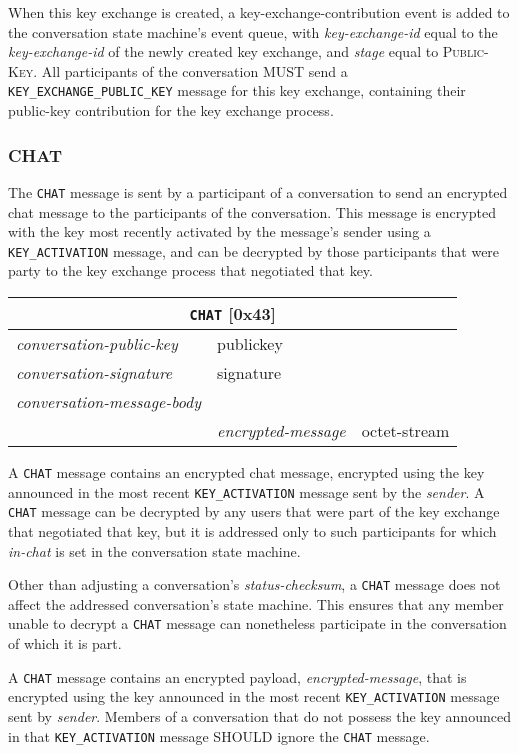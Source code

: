 \documentclass{article}
\def\message#1{\texttt{#1}}
\def\field#1{\textit{#1}}
\def\smfield#1{\textsl{#1}}
\def\type#1{\textsf{#1}}
\newenvironment{conversationmessage}[2]{
\newcommand{\messagefield}[2]{
& \field{##1} & \type{##2} \\
\hline
}
\hspace{2em minus 2em}\begin{tabular}{|l|l|l|}
\hline
\multicolumn{3}{|c|}{\message{#1} [#2]} \\
\hline
\hline
\field{conversation-public-key} & \multicolumn{2}{l|}{\type{publickey}} \\
\hline
\field{conversation-signature} & \multicolumn{2}{l|}{\type{signature}} \\
\hline
\field{conversation-message-body} & \multicolumn{2}{l|}{} \\
\hline
}{
\end{tabular}
}
\begin{document}
When this key exchange is created, a \type{key-exchange-contribution} event is added to the conversation state machine's event queue, with \smfield{key-exchange-id} equal to the \smfield{key-exchange-id} of the newly created key exchange, and \smfield{stage} equal to \textsc{Public-Key}.
All participants of the conversation MUST send a \message{KEY\_EXCHANGE\_PUBLIC\_KEY} message for this key exchange, containing their public-key contribution for the key exchange process.


\subsubsection{CHAT}
\label{sec:messages/chat}

The \message{CHAT} message is sent by a participant of a conversation to send an encrypted chat message to the participants of the conversation.
This message is encrypted with the key most recently activated by the message's sender using a \message{KEY\_ACTIVATION} message, and can be decrypted by those participants that were party to the key exchange process that negotiated that key.

\begin{conversationmessage}{CHAT}{0x43}
\messagefield{encrypted-message}{octet-stream}
\end{conversationmessage}

A \message{CHAT} message contains an encrypted chat message, encrypted using the key announced in the most recent \message{KEY\_ACTIVATION} message sent by the \field{sender}.
A \message{CHAT} message can be decrypted by any users that were part of the key exchange that negotiated that key, but it is addressed only to such participants for which \smfield{in-chat} is set in the conversation state machine.

Other than adjusting a conversation's \smfield{status-checksum}, a \message{CHAT} message does not affect the addressed conversation's state machine.
This ensures that any member unable to decrypt a \message{CHAT} message can nonetheless participate in the conversation of which it is part.

A \message{CHAT} message contains an encrypted payload, \field{encrypted-message}, that is encrypted using the key announced in the most recent \message{KEY\_ACTIVATION} message sent by \field{sender}.
Members of a conversation that do not possess the key announced in that \message{KEY\_ACTIVATION} message SHOULD ignore the \message{CHAT} message.
\end{document}
